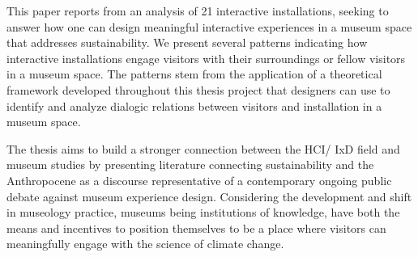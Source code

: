 This paper reports from an analysis of 21 interactive installations, seeking to answer how one can design meaningful interactive experiences in a museum space that addresses sustainability. We present several patterns indicating how interactive installations engage visitors with their surroundings or fellow visitors in a museum space. The patterns stem from the application of a theoretical framework developed throughout this thesis project that designers can use to identify and analyze dialogic relations between visitors and installation in a museum space.

The thesis aims to build a stronger connection between the HCI/ IxD field and museum studies by presenting literature connecting sustainability and the Anthropocene as a discourse representative of a contemporary ongoing public debate against museum experience design. Considering the development and shift in museology practice, museums being institutions of knowledge, have both the means and incentives to position themselves to be a place where visitors can meaningfully engage with the science of climate change. %